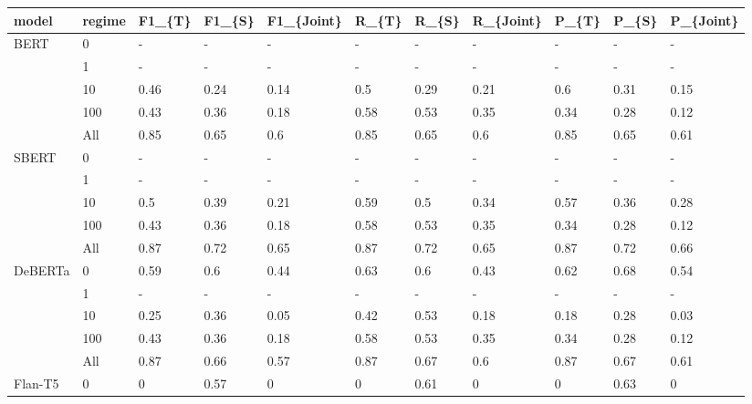 \begin{table}
\centering\begingroup\fontsize{10}{12}\selectfont

\begin{tabular}[t]{llll>{}l|ll>{}l|lll}
\toprule
model & regime & F1\_\{T\} & F1\_\{S\} & F1\_\{Joint\} & R\_\{T\} & R\_\{S\} & R\_\{Joint\} & P\_\{T\} & P\_\{S\} & P\_\{Joint\}\\
\midrule
BERT & 0 & - & - & - & - & - & - & - & - & -\\

 & 1 & - & - & - & - & - & - & - & - & -\\

 & 10 & 0.46 & 0.24 & 0.14 & 0.5 & 0.29 & 0.21 & 0.6 & 0.31 & 0.15\\

 & 100 & 0.43 & 0.36 & 0.18 & 0.58 & 0.53 & 0.35 & 0.34 & 0.28 & 0.12\\

 & All & 0.85 & 0.65 & 0.6 & 0.85 & 0.65 & 0.6 & 0.85 & 0.65 & 0.61\\
\cmidrule{1-11}
SBERT & 0 & - & - & - & - & - & - & - & - & -\\

 & 1 & - & - & - & - & - & - & - & - & -\\

 & 10 & 0.5 & 0.39 & 0.21 & 0.59 & 0.5 & 0.34 & 0.57 & 0.36 & 0.28\\

 & 100 & 0.43 & 0.36 & 0.18 & 0.58 & 0.53 & 0.35 & 0.34 & 0.28 & 0.12\\

 & All & 0.87 & 0.72 & 0.65 & 0.87 & 0.72 & 0.65 & 0.87 & 0.72 & 0.66\\
\cmidrule{1-11}
DeBERTa & 0 & 0.59 & 0.6 & 0.44 & 0.63 & 0.6 & 0.43 & 0.62 & 0.68 & 0.54\\

 & 1 & - & - & - & - & - & - & - & - & -\\

 & 10 & 0.25 & 0.36 & 0.05 & 0.42 & 0.53 & 0.18 & 0.18 & 0.28 & 0.03\\

 & 100 & 0.43 & 0.36 & 0.18 & 0.58 & 0.53 & 0.35 & 0.34 & 0.28 & 0.12\\

 & All & 0.87 & 0.66 & 0.57 & 0.87 & 0.67 & 0.6 & 0.87 & 0.67 & 0.61\\
\cmidrule{1-11}
Flan-T5 & 0 & 0 & 0.57 & 0 & 0 & 0.61 & 0 & 0 & 0.63 & 0\\


\end{tabular}
\end{table}
